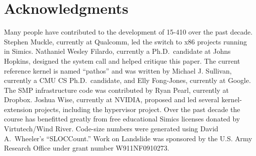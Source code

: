 

\section*{Acknowledgments}

Many people have contributed to the development of
15-410 over the past decade.
Stephen Muckle, currently at Qualcomm,
led the switch to x86 projects running in Simics.
Nathaniel Wesley Filardo,
currently a Ph.D.\ candidate at Johns Hopkins,
designed the  system call and helped critique this paper.
The current reference kernel is named ``pathos''
and was written by Michael J. Sullivan,
currently a CMU CS Ph.D.\ candidate,
and Elly Fong-Jones, currently at Google.
The SMP infrastructure code was contributed by
Ryan Pearl, currently at Dropbox.
Joshua Wise, currently at NVIDIA,
proposed and led several kernel-extension projects,
including the hypervisor project.
Over the past decade the course has benefitted
greatly from free educational Simics licenses
donated by Virtutech/Wind River.
Code-size numbers were generated using David A.\ Wheeler's
``SLOCCount.''
Work on Landslide was sponsored by the U.S. Army Research Office under grant number W911NF0910273.

